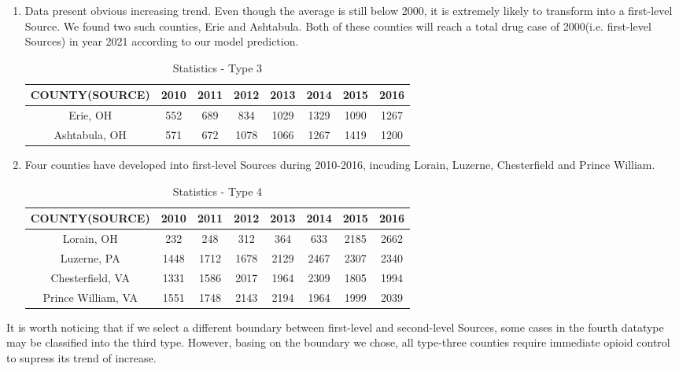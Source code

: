 \begin{enumerate}
	\item Data present obvious increasing trend. Even though the average is still below 2000, it is extremely likely to transform into a first-level Source. We found two such counties, Erie and Ashtabula. Both of these counties will reach a total drug case of 2000(i.e. first-level Sources) in year 2021 according to our model prediction.
	\begin{table}[H]
		\centering
		\begin{tabular}{|c|c|c|c|c|c|c|c|}
			\hline
			\rowcolor[HTML]{656565} 
			{\color[HTML]{FFFFFF} \textbf{COUNTY(SOURCE)}} & {\color[HTML]{FFFFFF} \textbf{2010}} & {\color[HTML]{FFFFFF} \textbf{2011}} & {\color[HTML]{FFFFFF} \textbf{2012}} & {\color[HTML]{FFFFFF} \textbf{2013}} & {\color[HTML]{FFFFFF} \textbf{2014}} & {\color[HTML]{FFFFFF} \textbf{2015}} & {\color[HTML]{FFFFFF} \textbf{2016}}\\ \hline
			 Erie, OH &552&689&834&1029&1329&1090&1267 \\ \hline
			 Ashtabula, OH&571&672&1078&1066&1267&1419&1200 \\ \hline
		\end{tabular}
		\centering
		\caption{Statistics - Type 3}
	\end{table}

	
	\item Four counties have developed into first-level Sources during 2010-2016, incuding Lorain, Luzerne, Chesterfield and Prince William. 
\begin{table}[H]
\centering
\begin{tabular}{|c|c|c|c|c|c|c|c|}
	\hline
	\rowcolor[HTML]{656565} 
	{\color[HTML]{FFFFFF} \textbf{COUNTY(SOURCE)}} &{\color[HTML]{FFFFFF} \textbf{2010}} & {\color[HTML]{FFFFFF} \textbf{2011}} & {\color[HTML]{FFFFFF} \textbf{2012}} & {\color[HTML]{FFFFFF} \textbf{2013}} & {\color[HTML]{FFFFFF} \textbf{2014}} & {\color[HTML]{FFFFFF} \textbf{2015}} & {\color[HTML]{FFFFFF} \textbf{2016}}\\ \hline
	 Lorain, OH&232&248&312&364&633&2185&2662 \\ \hline
	 Luzerne, PA&1448&1712&1678&2129&2467&2307&2340 \\ \hline
	 Chesterfield, VA&1331&1586&2017&1964&2309&1805&1994 \\ \hline
	 Prince William, VA&1551&1748&2143&2194&1964&1999&2039 \\ \hline
\end{tabular}
\centering
\caption{Statistics - Type 4}
\end{table}
\end{enumerate}

It is worth noticing that if we select a different boundary between first-level and second-level Sources, some cases in the fourth datatype may be classified into the third type. However, basing on the boundary we chose, all type-three counties require immediate opioid control to supress its trend of increase.





